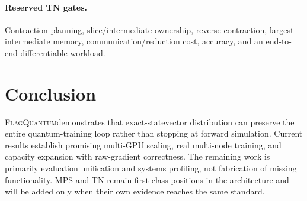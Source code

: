 \documentclass[10pt,twocolumn]{article}
\newcommand{\system}{\textsc{FlagQuantum}}
\begin{document}
\paragraph{Reserved TN gates.}
Contraction planning, slice/intermediate ownership, reverse contraction,
largest-intermediate memory, communication/reduction cost, accuracy, and an
end-to-end differentiable workload.

\section{Conclusion}

\system demonstrates that exact-statevector distribution can preserve the
entire quantum-training loop rather than stopping at forward simulation.
Current results establish promising multi-GPU scaling, real multi-node
training, and capacity expansion with raw-gradient correctness.  The remaining
work is primarily evaluation unification and systems profiling, not fabrication
of missing functionality.  MPS and TN remain first-class positions in the
architecture and will be added only when their own evidence reaches the same
standard.
\end{document}
